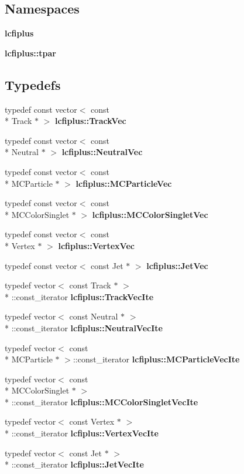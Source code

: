 \subsection*{Namespaces}
\begin{DoxyCompactItemize}
\item 
{\bf lcfiplus}
\item 
{\bf lcfiplus\-::tpar}
\end{DoxyCompactItemize}
\subsection*{Typedefs}
\begin{DoxyCompactItemize}
\item 
typedef const vector$<$ const \\*
Track $\ast$ $>$ {\bf lcfiplus\-::\-Track\-Vec}
\item 
typedef const vector$<$ const \\*
Neutral $\ast$ $>$ {\bf lcfiplus\-::\-Neutral\-Vec}
\item 
typedef const vector$<$ const \\*
M\-C\-Particle $\ast$ $>$ {\bf lcfiplus\-::\-M\-C\-Particle\-Vec}
\item 
typedef const vector$<$ const \\*
M\-C\-Color\-Singlet $\ast$ $>$ {\bf lcfiplus\-::\-M\-C\-Color\-Singlet\-Vec}
\item 
typedef const vector$<$ const \\*
Vertex $\ast$ $>$ {\bf lcfiplus\-::\-Vertex\-Vec}
\item 
typedef const vector$<$ const Jet $\ast$ $>$ {\bf lcfiplus\-::\-Jet\-Vec}
\item 
typedef vector$<$ const Track $\ast$ $>$\\*
\-::const\-\_\-iterator {\bf lcfiplus\-::\-Track\-Vec\-Ite}
\item 
typedef vector$<$ const Neutral $\ast$ $>$\\*
\-::const\-\_\-iterator {\bf lcfiplus\-::\-Neutral\-Vec\-Ite}
\item 
typedef vector$<$ const \\*
M\-C\-Particle $\ast$ $>$\-::const\-\_\-iterator {\bf lcfiplus\-::\-M\-C\-Particle\-Vec\-Ite}
\item 
typedef vector$<$ const \\*
M\-C\-Color\-Singlet $\ast$ $>$\\*
\-::const\-\_\-iterator {\bf lcfiplus\-::\-M\-C\-Color\-Singlet\-Vec\-Ite}
\item 
typedef vector$<$ const Vertex $\ast$ $>$\\*
\-::const\-\_\-iterator {\bf lcfiplus\-::\-Vertex\-Vec\-Ite}
\item 
typedef vector$<$ const Jet $\ast$ $>$\\*
\-::const\-\_\-iterator {\bf lcfiplus\-::\-Jet\-Vec\-Ite}
\end{DoxyCompactItemize}

